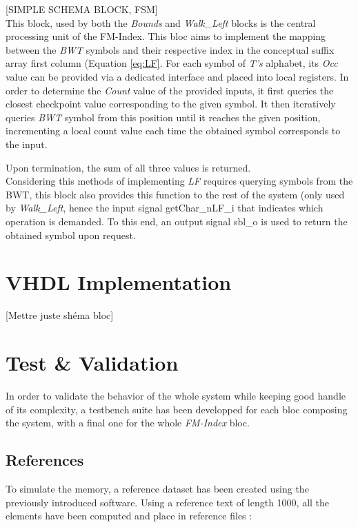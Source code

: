 [SIMPLE SCHEMA BLOCK, FSM] \\

This block, used by both the \textsl{Bounds} and \textsl{Walk\_Left} blocks is the central processing unit of the FM-Index. This bloc aims to implement the mapping between the \textsl{BWT} symbols and their respective index in the conceptual suffix array first column (Equation \ref{eq:LF}. For each symbol of \textsl{T's} alphabet, its \textsl{Occ} value can be provided via a dedicated interface and placed into local registers. In order to determine the \textsl{Count} value of the provided inputs, it first queries the closest checkpoint value corresponding to the given symbol. It then iteratively queries \textsl{BWT} symbol from this position until it reaches the given position, incrementing a local count value each time the obtained symbol corresponds to the input.

Upon termination, the sum of all three values is returned. \\

Considering this methods of implementing \textsl{LF} requires querying symbols from the BWT, this block also provides this function to the rest of the system (only used by \textsl{Walk\_Left}, hence the input signal \textrm{getChar\_nLF\_i} that indicates which operation is demanded. To this end, an output signal \textrm{sbl\_o} is used to return the obtained symbol upon request.

\section{VHDL Implementation}

[Mettre juste shéma bloc]


\section{Test \& Validation}

In order to validate the behavior of the whole system while keeping good handle of its complexity, a testbench suite has been developped for each bloc composing the system, with a final one for the whole \textsl{FM-Index} bloc. \\

\subsection{References}
To simulate the memory, a reference dataset has been created using the previously introduced software. Using a reference text of length 1000, all the elements have been computed and place in reference files :

